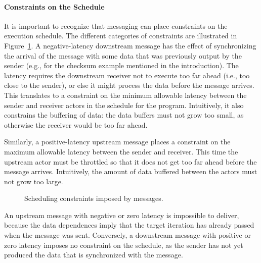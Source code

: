 \paragraph*{Constraints on the Schedule}  
\label{sec:constraints}
It is important to recognize that messaging can place constraints on
the execution schedule.  The different categories of constraints are
illustrated in Figure~\ref{tab:messcons}.  A negative-latency
downstream message has the effect of synchronizing the arrival of the
message with some data that was previously output by the sender (e.g.,
for the checksum example mentioned in the introduction).  The latency
requires the downstream receiver not to execute too far ahead (i.e.,
too close to the sender), or else it might process the data before the
message arrives.  This translates to a constraint on the minimum
allowable latency between the sender and receiver actors in the
schedule for the program.  Intuitively, it also constrains the
buffering of data: the data buffers must not grow too small, as
otherwise the receiver would be too far ahead.

Similarly, a positive-latency upstream message places a constraint on
the maximum allowable latency between the sender and receiver.  This
time the upstream actor must be throttled so that it does not get too
far ahead before the message arrives.  Intuitively, the amount of data
buffered between the actors must not grow too large.

\begin{figure}[t]
\begin{center}
\vspace{-16pt}
\caption{\small Scheduling constraints imposed by messages.}
\label{tab:messcons}
\end{center}
\vspace{-18pt}
\end{figure}

An upstream message with negative or zero latency is impossible to
deliver, because the data dependences imply that the target iteration
has already passed when the message was sent.  Conversely, a
downstream message with positive or zero latency imposes no constraint
on the schedule, as the sender has not yet produced the data that is
synchronized with the message.

